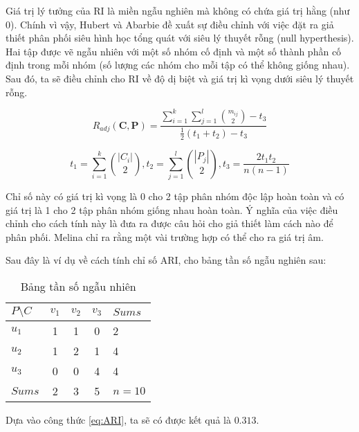 Giá trị lý tưởng của RI là miền ngẫu nghiên mà không có chứa giá trị hằng (như $0$).
Chính vì vậy, Hubert và Abarbie đề xuất sự điều chỉnh với việc đặt ra giả thiết phân phối siêu hình học tổng quát với siêu lý thuyết rỗng (null hyperthesis).
Hai tập được vẽ ngẫu nhiên với một số nhóm cố định và một số thành phần cố định trong mỗi nhóm (số lượng các nhóm cho mỗi tập có thể không giống nhau).
Sau đó, ta sẽ điều chỉnh cho RI về độ dị biệt và giá trị kì vọng dưới siêu lý thuyết rỗng.
\begin{center}
\begin{equation} \label{eq:ARI}
R_{adj}(\textbf{C}, \textbf{P}) = \frac{\sum^k_{i=1} \sum^l_{j=1} \binom {m_{ij}}  {2} - t_3}{\frac{1}{2} (t_1 + t_2) - t_3}
\end{equation}

\begin{equation} \label{eq:ARIParts}
t_1 = \sum^k_{i=1} \binom {|C_i|} {2} , t_2 = \sum_{j=1}^l \binom {|P_j|} {2}, t_3 = \frac{2 t_1 t_2}{n (n - 1)}
\end{equation}
\end{center}

Chỉ số này có giá trị kì vọng là 0 cho 2 tập phân nhóm độc lập hoàn toàn và có giá trị là 1 cho 2 tập phân nhóm giống nhau hoàn toàn.
Ý nghĩa của việc điều chỉnh cho cách tính này là đưa ra được câu hỏi cho giả thiết làm cách nào để phân phối.
Melina chỉ ra rằng một vài trường hợp có thể cho ra giá trị âm\cite{Melina-ARI}.

Sau đây là ví dụ về cách tính chỉ số ARI, cho bảng tần số ngẫu nghiên sau:
\begin{table}[ht]
\begin{center}
\begin{tabular}{l|c c c|l}
\hline
$P \setminus C$ & $v_1$ & $v_2$ & $v_3$ & $Sums$ \\
\hline
$u_1$ & 1 & 1 & 0 & 2 \\
$u_2$ & 1 & 2 & 1 & 4 \\
$u_3$ & 0 & 0 & 4 & 4 \\
\hline
$Sums$ & 2 & 3 & 5 & $n = 10$ \\
\end{tabular}
\caption[Bảng tần số ngẫu nhiên]{Bảng tần số ngẫu nhiên}
\label{bang_4_5}
\end{center}
\end{table}

Dựa vào công thức \ref{eq:ARI}, ta sẽ có được kết quả là $0.313$.


